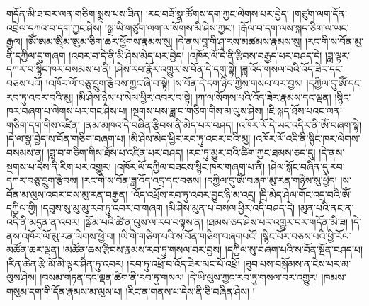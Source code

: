 གདོན་མི་ཟ་བར་ལན་གཅིག་སྨྲས་པས་ཟིན། །རང་བཟོ་སྣ་ཚོགས་དག་ཀྱང་ལེགས་པར་བྱེད། །གཙུག་ལག་དོན་འབྲེལ་དཀའ་བ་དག་ཀྱང་ཤེས། །སྒྲ་ཡི་གཙུག་ལག་ལ་སོགས་མི་ཤེས་ཀྱང་། །རྒོལ་བ་དག་ལས་སྐད་ཅིག་ལ་ཡང་རྒྱལ། །ཨོཾ་ཨམ་ཨཱིམ་ཨུམ་ཅིག་ཆར་ཕྱོགས་རྣམས་སུ། །དེ་ནས་བཱ་གི་ཤྭ་རས་མཚམས་རྣམས་སུ། །རང་གི་ས་བོན་མུ་ནི་དཀྱིལ་དུ་གཞག །འབར་བ་དེ་ནི་མི་ཤེས་མེད་པར་བྱེད། །འཁོར་ལོ་དེ་ནི་རྩིབས་བརྒྱད་པར་བཤད་དེ། །ཟླ་ལྟར་དཀར་བ་སྙིང་ཁར་བསམས་པ་ནི། །ཤེས་རབ་རྣོར་འགྱུར་ས་བོན་དེ་དགུ་སྟེ། །ཟླ་འོད་གསལ་བའི་འོད་ཟེར་དང་བཅས་པའོ། །འཁོར་ལོ་བཅུ་དྲུག་རྩིབས་ཀྱང་ཞི་བ་སྟེ། །ས་བོན་དེ་དག་ཉིད་ཀྱིས་གསལ་བར་བྱས། །དཀྱིལ་དུ་ཨོཾ་དང་རབ་ཏུ་འབར་བའི་མུ། །མི་ཤེས་ཉེས་པ་སེལ་ཕྱིར་འབར་བ་སྟེ། །ཀ་ལ་སོགས་པའི་འོད་ཟེར་རྣམས་དང་ལྡན། །སྙིང་ཁར་བཞག་པ་ལེགས་པར་གང་ཤེས་པ། །སྔགས་པས་ཟླ་བ་གཅིག་གིས་མ་ལུས་ཤེས། །ཇི་སྐད་ཐོས་པའང་ལན་གཅིག་དག་གིས་འཛིན། །ནམ་མཁའ་དེ་བཞིན་རྩིབས་ནི་མེད་པར་བཤད། །འཁོར་ལོ་དེ་ཡང་འདིར་ནི་ཨོཾ་བཞག་སྟེ། །དེ་ལ་སྣ་བྱེད་ས་བོན་གཅིག་བཞག་པ། །མི་ཤེས་མེད་ཕྱིར་རབ་ཏུ་འབར་བའི་མུ། །འཁོར་ལོ་འདི་ནི་སྙིང་ཁར་ལེགས་བསམས་ན། །ཟླ་བ་གཅིག་གིས་ཐོས་པ་འཛིན་པར་བཤད། །རབ་ཏུ་མྱུར་བའི་ཚིག་ཀྱང་ཐམས་ཅད་དུ། །དེ་ནས་སྔགས་པ་དེས་ནི་རིག་པར་འགྱུར། །འཁོར་ལོ་དཀྱིལ་བཟངས་སྙིང་ཁར་གཞག་པ་ནི། །ཤེལ་སྒོང་བཞིན་དུ་རབ་དཀར་བཅུ་དྲུག་རྩིབས། །རང་གི་ས་བོན་ཟླ་འོད་འདྲ་དང་བཅས། །དཀྱིལ་དུ་ཨོཾ་བཞག་མུ་རན་གཉིས་སུ་ཕྱེད། །ས་བོན་མ་ལུས་འབར་བས་མུ་རན་བརྒྱན། །འོད་འཕྲོས་རབ་ཏུ་འབར་བྱུང་ཉི་མ་འདྲ། །དྲི་མེད་ཤེལ་གོང་འདྲ་བའི་ཨོཾ་དཀྱིལ་གྱི། །དབུས་སུ་མུ་མུ་རབ་ཏུ་འབར་བ་གཞག །མི་ཤེས་མུན་པ་བསལ་ཕྱིར་འདི་བཤད་དེ། །མུན་པའི་ནང་ན་འདི་ནི་མདུན་ན་འབར། །སྒོམ་པའི་ཚེ་ན་ལུས་ལ་རབ་བལྟས་ན། །ཐམས་ཅད་ཤེས་པར་འགྱུར་བར་གདོན་མི་ཟ། །དེ་ནས་འཁོར་ལོ་མུ་རན་ལེགས་ཕྱེ་བ། །ཡི་གེ་གཅིག་པའི་ས་བོན་གཅིག་བཞགཔའོ། །སྙིང་པོར་བཅས་པའི་ཕྱི་རོལ་མཚོན་ཆར་ལྡན། །མཚོན་ཆས་རྩིབས་རྣམས་རབ་ཏུ་གསལ་བར་བྱས། །དཀྱིལ་སུ་བཞག་པའི་ས་བོན་སྔོན་བཤད་པ། །རིན་ཆེན་རྩེ་མོ་མེ་ལྟར་ཤིན་ཏུ་འབར། །རབ་ཏུ་འཕྲོ་བ་འོད་ཟེར་མང་པོ་འཕྲོ། །ཐུབ་པས་བསྒོམས་ན་ངེས་པར་མ་ལུས་ཤེས། །བསམ་གཏན་དང་ལྡན་ཚིག་ནི་རབ་ཏུ་གསལ། །དེ་ཡི་ལུས་ཀྱང་རབ་ཏུ་གསལ་བར་འགྱུར། །ཁམས་གསུམ་དག་གི་དོན་རྣམས་མ་ལུས་པ། །རིང་ན་གནས་པ་དེས་ནི་ཅི་བཞིན་ཤེས། །
